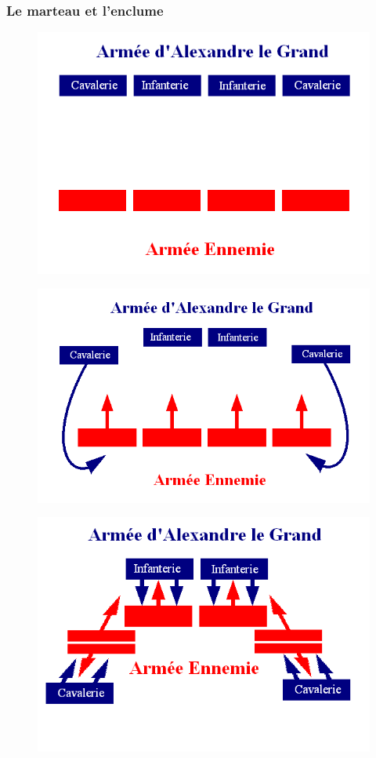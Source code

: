 \documentclass{article}
\begin{document}
\subsubsection{Le marteau et l'enclume}
\begin{figure}[H]
	\begin{centering}
	\includegraphics[width=0.8\linewidth]{../ressources/marteau}
	\caption{}
	\end{centering}
\end{figure}
\begin{figure}[H]
	\begin{centering}
	\includegraphics[width=0.8\linewidth]{../ressources/marteau2}
	\caption{}
	\end{centering}
\end{figure}
\begin{figure}[H]
	\begin{centering}
	\includegraphics[width=0.8\linewidth]{../ressources/enclume}
	\caption{}
	\end{centering}
\end{figure}
\end{document}
